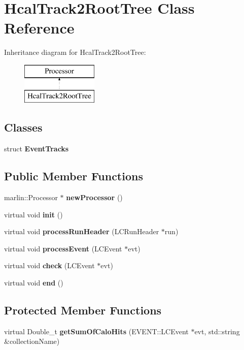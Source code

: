 \section{Hcal\-Track2\-Root\-Tree Class Reference}
\label{classHcalTrack2RootTree}
Inheritance diagram for Hcal\-Track2\-Root\-Tree\-:\begin{figure}[H]
\begin{center}
\leavevmode
\includegraphics[height=2.000000cm]{classHcalTrack2RootTree}
\end{center}
\end{figure}
\subsection*{Classes}
\begin{DoxyCompactItemize}
\item 
struct {\bf Event\-Tracks}
\end{DoxyCompactItemize}
\subsection*{Public Member Functions}
\begin{DoxyCompactItemize}
\item 
marlin\-::\-Processor $\ast$ {\bfseries new\-Processor} ()\label{classHcalTrack2RootTree_ad456236ad38e9e2c1be0a5a2eac93874}

\item 
virtual void {\bf init} ()
\item 
virtual void {\bf process\-Run\-Header} (L\-C\-Run\-Header $\ast$run)
\item 
virtual void {\bf process\-Event} (L\-C\-Event $\ast$evt)
\item 
virtual void {\bfseries check} (L\-C\-Event $\ast$evt)\label{classHcalTrack2RootTree_a29f5c20d6ec66e5f6b4921bdaa2278d4}

\item 
virtual void {\bf end} ()
\end{DoxyCompactItemize}
\subsection*{Protected Member Functions}
\begin{DoxyCompactItemize}
\item 
virtual Double\-\_\-t {\bfseries get\-Sum\-Of\-Calo\-Hits} (E\-V\-E\-N\-T\-::\-L\-C\-Event $\ast$evt, std\-::string \&collection\-Name)\label{classHcalTrack2RootTree_ae11e481bdb20b591aee8c8a1ef49ab4b}

\end{DoxyCompactItemize}
